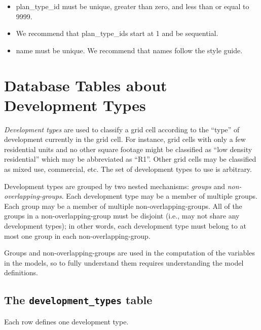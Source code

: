 \begin{itemize} \tight
\item plan_type_id must be unique, greater than zero, and less than or equal to 9999.
\item We recommend that plan_type_ids start at 1 and be sequential.
\item name must be unique. We recommend that names follow the style guide.

\end{itemize}


\section{Database Tables about Development Types}
\label{sec:development-tables}

\emph{Development types} are used to classify a grid cell according to the
``type'' of development currently in the grid cell.  For instance, grid cells
with only a few residential units and no other square footage might be
classified as ``low density residential'' which may be abbreviated as ``R1''.
Other grid cells may be classified as mixed use, commercial, etc.  The set of
development types to use is arbitrary.

Development types are grouped by two nested mechanisms: \emph{groups} and
\emph{non-overlapping-groups}. Each development type may be a member of
multiple groups. Each group may be a member of multiple
non-overlapping-groups. All of the groups in a non-overlapping-group must be
disjoint (i.e., may not share any development types); in other words, each
development type must belong to at most one group in each
non-overlapping-group.

Groups and non-overlapping-groups are used in the computation of the variables \variablesindex
in the models, so to fully understand them requires understanding the model \modelsindex
definitions.

\subsection{The {\tt development_types} table}

Each row defines one development type.

